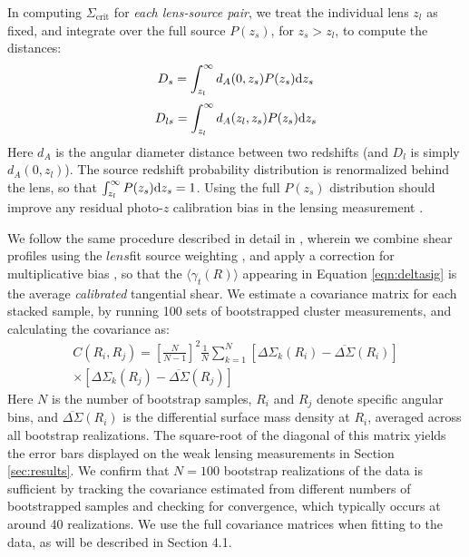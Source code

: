 In computing $\Sigma_{\mathrm{crit}}$ for {\it each lens-source pair}, we treat the individual lens $z_l$ as fixed, and integrate over the full source $P(z_s)$, for $z_s > z_l$, to compute the distances:
\begin{equation}
D_s = \int_{z_l}^{\infty} d_A(0,z_s) P(z_s) {\rm d}z_s
\end{equation}
\begin{equation}
D_{ls} = \int_{z_l}^{\infty} d_A(z_l,z_s) P(z_s) {\rm d}z_s
\end{equation}
Here $d_A$ is the angular diameter distance between two redshifts (and $D_l$ is simply $d_A(0,z_l)$). The source redshift probability distribution is renormalized behind the lens, so that $\int_{z_l}^{\infty} P(z_s) {\rm d}z_s = 1$. Using the full $P(z_s)$ distribution should improve any residual photo-$z$ calibration bias in the lensing measurement \citep{Mandelbaum08a}.

We follow the same procedure described in detail in \citet{Velander14}, wherein we combine shear profiles using the $lens$fit source weighting \citep[Equation 8 of][]{Miller13}, and apply a correction for multiplicative bias \citep{Miller13}, so that the $\langle \gamma_t(R) \rangle$ appearing in Equation \ref{eqn:deltasig} is the average {\it calibrated} tangential shear. We estimate a covariance matrix for each stacked sample, by running 100 sets of bootstrapped cluster measurements, and calculating the covariance as:
\begin{equation}
\begin{split}
C(R_i,R_j) = \left[ \frac{N}{N-1} \right]^2 \frac{1}{N} \sum_{k=1}^{N} \left[\Delta\Sigma_k(R_i) - \overline{\Delta\Sigma}(R_i)\right] \\
\times \left[\Delta\Sigma_k(R_j) - \overline{\Delta\Sigma}(R_j)\right]
\end{split}
\end{equation}
Here $N$ is the number of bootstrap samples, $R_i$ and $R_j$ denote specific angular bins, and $\overline{\Delta\Sigma}(R_i)$ is the differential surface mass density at $R_i$, averaged across all bootstrap realizations. The square-root of the diagonal of this matrix yields the error bars displayed on the weak lensing measurements in Section \ref{sec:results}. We confirm that $N=100$ bootstrap realizations of the data is sufficient by tracking the covariance estimated from different numbers of bootstrapped samples and checking for convergence, which typically occurs at around 40 realizations. We use the full covariance matrices when fitting to the data, as will be described in Section 4.1.

